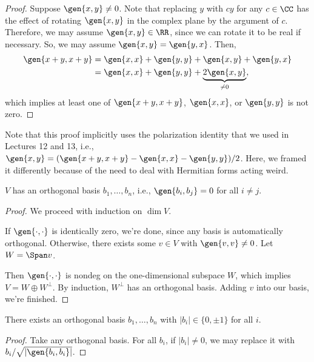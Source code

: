 \begin{proof}

Suppose $\gen{x,y}\neq 0$. Note that replacing $y$ with $cy$ for any $c\in \CC$ has the effect of rotating $\gen{x,y}$ in the complex plane by the argument of $c$. Therefore, we may assume $\gen{x,y}\in \RR$, since we can rotate it to be real if necessary. So, we may assume $\gen{x,y} = \gen{y,x}$. Then, 
\begin{align*}
    \gen{x+y, x+y} &= \gen{x,x} + \gen{y,y} + \gen{x,y} + \gen{y,x} \\
    &= \gen{x,x} + \gen{y,y} + \underbrace{2\gen{x,y}}_{\neq 0},
\end{align*}
which implies at least one of $\gen{x+y, x+y}$, $\gen{x,x}$, or $\gen{y,y}$ is not zero. 
\end{proof}

Note that this proof implicitly uses the polarization identity that we used in Lectures 12 and 13, i.e., $\gen{x,y} = (\gen{x+y, x+y} - \gen{x,x} - \gen{y,y})/2$. Here, we framed it differently because of the need to deal with Hermitian forms acting weird. 

\begin{theorem}
\thmlabel

$V$ has an orthogonal basis $b_1, \hdots, b_n$, i.e., $\gen{b_i, b_j} = 0$ for all $i\neq j$. 
\end{theorem}

\begin{proof}
We proceed with induction on $\dim V$. 

If $\gen{\cdot, \cdot}$ is identically zero, we're done, since any basis is automatically orthogonal. Otherwise, there exists some $v\in V$ with $\gen{v,v}\neq 0$. Let $W = \Span v$.

Then $\gen{\cdot, \cdot}$ is nondeg on the one-dimensional subspace $W$, which implies $V = W\oplus W^{\perp}$. By induction, $W^{\perp}$ has an orthogonal basis. Adding $v$ into our basis, we're finished. 
\end{proof}

\begin{theorem}
\corlabel

There exists an orthogonal basis $b_1, \hdots, b_n$ with $\vert b_i\vert \in \{0,\pm 1\}$ for all $i$.
\end{theorem}

\begin{proof}
Take any orthogonal basis. For all $b_i$, if $\vert b_i\vert\neq 0$, we may replace it with $b_i/\sqrt{\vert \gen{b_i, b_i}\vert}$. 
\end{proof}

